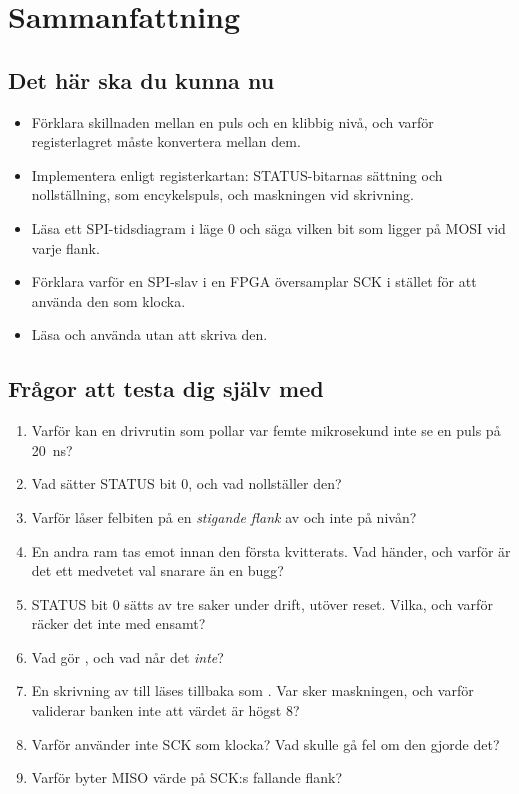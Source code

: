 
\section{Sammanfattning}
\label{c18:sec:review}

\subsection*{Det här ska du kunna nu}
\begin{itemize}
  \item Förklara skillnaden mellan en puls och en klibbig nivå, och varför registerlagret måste
    konvertera mellan dem.
  \item Implementera  enligt registerkartan: STATUS-bitarnas sättning och
    nollställning,  som encykelspuls, och maskningen vid skrivning.
  \item Läsa ett SPI-tidsdiagram i läge 0 och säga vilken bit som ligger på MOSI vid varje flank.
  \item Förklara varför en SPI-slav i en FPGA översamplar SCK i stället för att använda den som
    klocka.
  \item Läsa och använda  utan att skriva den.
\end{itemize}

\subsection*{Frågor att testa dig själv med}
\begin{enumerate}
  \item Varför kan en drivrutin som pollar var femte mikrosekund inte se en puls på 20~ns?
  \item Vad sätter STATUS bit 0, och vad nollställer den?
  \item Varför låser felbiten på en \emph{stigande flank} av  och inte på nivån?
  \item En andra ram tas emot innan den första kvitterats. Vad händer, och varför är det ett medvetet
    val snarare än en bugg?
  \item STATUS bit 0 sätts av tre saker under drift, utöver reset. Vilka, och varför räcker det inte
    med  ensamt?
  \item Vad gör , och vad når det \emph{inte}?
  \item En skrivning av  till  läses tillbaka som .
    Var sker maskningen, och varför validerar banken inte att värdet är högst 8?
  \item Varför använder  inte SCK som klocka? Vad skulle gå fel om den gjorde det?
  \item Varför byter MISO värde på SCK:s fallande flank?
\end{enumerate}

